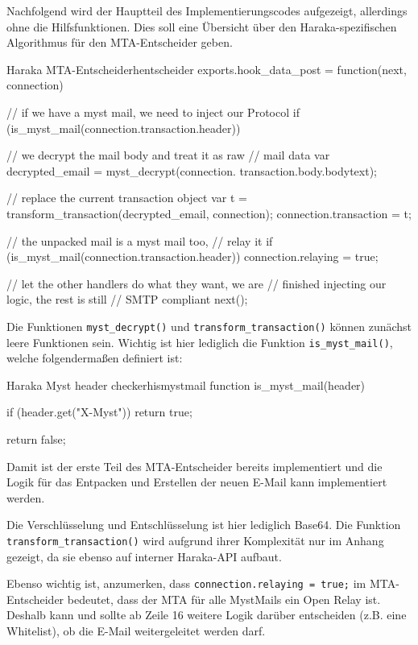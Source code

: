 Nachfolgend wird der Hauptteil des Implementierungscodes aufgezeigt, allerdings ohne die Hilfsfunktionen. Dies soll eine Übersicht über den Haraka-spezifischen Algorithmus für den MTA-Entscheider geben.

\begin{minipage}{\linewidth}
\begin{JavaScript}{Haraka MTA-Entscheider}{hentscheider}
exports.hook_data_post = function(next, connection) {
    // if we have a myst mail, we need to inject our Protocol
    if (is_myst_mail(connection.transaction.header)) {
        // we decrypt the mail body and treat it as raw
        // mail data
        var decrypted_email = myst_decrypt(connection.
        	transaction.body.bodytext);

        // replace the current transaction object
        var t = transform_transaction(decrypted_email,
        	connection);
        connection.transaction = t;

        // the unpacked mail is a myst mail too, 
        // relay it
        if (is_myst_mail(connection.transaction.header)) {
            connection.relaying = true;
        }
    }

    // let the other handlers do what they want, we are
    // finished injecting our logic, the rest is still
    // SMTP compliant
    next();
}
\end{JavaScript}
\end{minipage}

Die Funktionen \verb#myst_decrypt()# und \verb#transform_transaction()# können zunächst leere Funktionen sein. Wichtig ist hier lediglich die Funktion \verb#is_myst_mail()#, welche folgendermaßen definiert ist:

\begin{JavaScript}{Haraka Myst header checker}{hismystmail}
function is_myst_mail(header) {
    if (header.get("X-Myst")) {
        return true;
    }

    return false;
}
\end{JavaScript}

Damit ist der erste Teil des MTA-Entscheider bereits implementiert und die Logik für das Entpacken und Erstellen der neuen E-Mail kann implementiert werden.

Die Verschlüsselung und Entschlüsselung ist hier lediglich Base64. Die Funktion \verb#transform_transaction()# wird aufgrund ihrer Komplexität nur im Anhang gezeigt, %
da sie ebenso auf interner Haraka-API aufbaut.

Ebenso wichtig ist, anzumerken, dass \verb#connection.relaying = true;# im MTA-Entscheider bedeutet, dass der MTA für alle MystMails ein Open Relay ist. Deshalb kann und sollte ab Zeile 16 weitere Logik darüber entscheiden (z.B. eine Whitelist), ob die E-Mail weitergeleitet werden darf.
